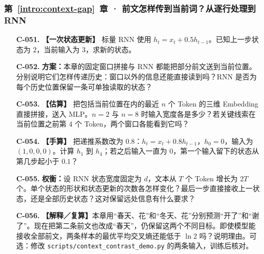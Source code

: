 \subsubsection*{第~\ref*{intro:context-gap}~章 · 前文怎样传到当前词？从逐行处理到 RNN}
\begin{enumerate}[label={},leftmargin=4.8em,itemsep=4pt]
\item[\textbf{C-051.}] \leavevmode{}\label{exercise:C-051}\label{exercise:rnn-one-step}\textbf{【一次状态更新】} 标量 RNN 使用 $h_t=x_t+0.5h_{t-1}$。已知上一步状态为 $2$，当前输入为 $3$，求新的状态。
\item[\textbf{C-052.}] \leavevmode{}\label{exercise:C-052}\label{exercise:history-model-comparison}\textbf{方案：}本章的固定窗口拼接与 RNN 都能把部分前文送到当前位置。分别说明它们怎样传递历史：窗口以外的信息还能直接读到吗？RNN 是否为每个历史位置保留一条可单独读取的状态？
\item[\textbf{C-053.}] \leavevmode{}\label{exercise:C-053}\label{exercise:window-input-width}\textbf{【估算】} 把包括当前位置在内的最近 $n$ 个 Token 的三维 Embedding 直接拼接，送入 MLP。$n=2$ 与 $n=8$ 时输入宽度各是多少？若关键线索在当前位置之前第 $4$ 个 Token，两个窗口各能看到它吗？
\item[\textbf{C-054.}] \leavevmode{}\label{exercise:C-054}\label{exercise:rnn-decay}\textbf{【手算】} 把递推系数改为 $0.8$：$h_t=x_t+0.8h_{t-1}$，$h_0=0$，输入为 $(1,0,0,0)$。计算 $h_1$ 到 $h_4$；若之后输入一直为 $0$，第一个输入留下的状态从第几步起小于 $0.1$？
\item[\textbf{C-055.}] \leavevmode{}\label{exercise:C-055}\label{exercise:rnn-state-scaling}\textbf{权衡：}设 RNN 状态宽度固定为 $d$，文本从 $T$ 个 Token 增长为 $2T$ 个。单个状态的形状和状态更新的次数各怎样变化？最后一步直接接收上一状态，还是全部历史状态？这对保留远处信息有什么要求？
\item[\textbf{C-056.}] \leavevmode{}\label{exercise:C-056}\label{exercise:context-conflicting-labels}\textbf{【解释／复算】}本章用“春天、花”和“冬天、花”分别预测“开了”和“谢了”。现在把第二条前文也改成“春天”，仍保留这两个不同目标。即使模型能接收全部前文，两条样本的最优平均交叉熵还能低于 $\ln2$ 吗？说明理由。可选：修改 \nolinkurl{scripts/context_contrast_demo.py} 的两条输入，训练后核对。
\end{enumerate}
